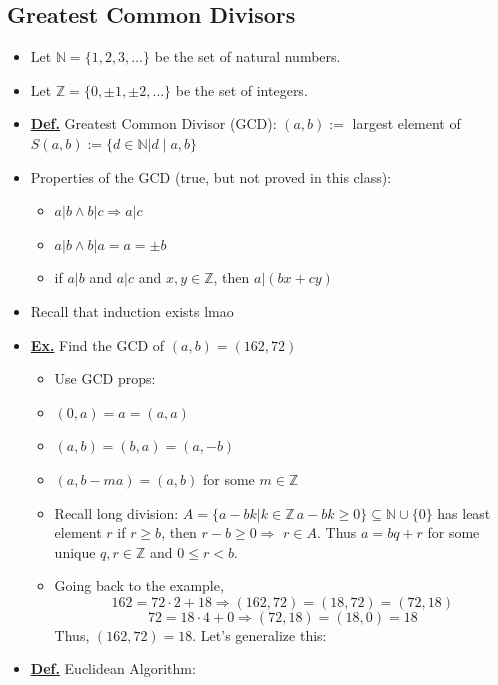 \documentclass[11pt]{article}
\newcommand{\defn}{\underline{\textbf{Def.}} }
\newcommand{\ex}{\underline{\textbf{Ex.}} }
\begin{document}
\subsection{Greatest Common Divisors}
\begin{itemize}
    \item Let \(\mathbb{N} = \{1, 2, 3, \dots\}\) be the set of natural numbers.
    \item Let \(\mathbb{Z} = \{0, \pm 1, \pm 2, \dots\}\) be the set of integers.
    \item \defn Greatest Common Divisor (GCD): \((a,b) :=\) largest element of \(S(a,b) := \{d \in \mathbb{N} | d \mid a, b\}\)
    \item Properties of the GCD (true, but not proved in this class):
    \begin{itemize}
        \item \(a|b \wedge b|c \Rightarrow a|c\)
        \item \(a|b \wedge b|a = a = \pm b\)
        \item if \(a|b\) and \(a|c\) and \(x, y \in \mathbb{Z}\), then \(a|(bx + cy)\)
    \end{itemize}
    \item Recall that induction exists lmao
    \item \ex Find the GCD of \((a,b) = (162, 72)\)
    \begin{itemize}
        \item Use GCD props:
        \item \((0, a) = a = (a,a)\)
        \item \((a, b) = (b,a) = (a, -b) \)
        \item \((a, b-ma) = (a, b) \) for some \(m \in \mathbb{Z}\)
        \item Recall long division: \(A = \{a-bk | k \in \mathbb{Z}\, a-bk \geq 0\} \subseteq \mathbb{N} \cup \{0\}\) has least element \(r\) if \(r \geq b\), then \(r-b \geq 0 \Rightarrow \) \(r \in A\). Thus \(a = bq + r\) for some unique \(q, r \in \mathbb{Z}\) and \(0 \leq r < b\).
        \item Going back to the example,
        \[
        162 = 72 \cdot 2 + 18 \Rightarrow (162, 72) = (18, 72) = (72, 18)
        \]
        \[
        72 = 18 \cdot 4 + 0 \Rightarrow (72, 18) = (18, 0) = 18
        \]
        Thus, \((162, 72) = 18\). Let's generalize this:
    \end{itemize}
    \item \defn Euclidean Algorithm:
    \begin{itemize}

\end{itemize}
\end{itemize}
\end{document}
